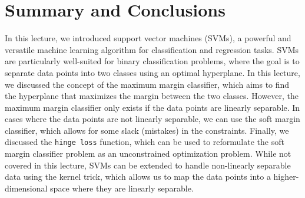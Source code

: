 \documentclass{article}[11pt]
\begin{document}
\section{Summary and Conclusions}
In this lecture, we introduced support vector machines (SVMs), a powerful and versatile machine learning algorithm for classification and regression tasks. SVMs are particularly well-suited for binary classification problems, where the goal is to separate data points into two classes using an optimal hyperplane. In this lecture, we discussed the concept of the maximum margin classifier, which aims to find the hyperplane that maximizes the margin between the two classes. However, the maximum margin classifier only exists if the data points are linearly separable. 
In cases where the data points are not linearly separable, we can use the soft margin classifier, which allows for some slack (mistakes) in the constraints. Finally, we discussed the \texttt{hinge loss} function, which can be used to reformulate the soft margin classifier problem as an unconstrained optimization problem. While not covered in this lecture, SVMs can be extended to handle non-linearly separable data using the kernel trick, which allows us to map the data points into a higher-dimensional space where they are linearly separable. 

\raggedright

\end{document}
